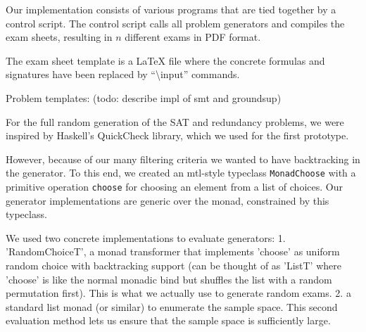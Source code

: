 Our implementation consists of various programs that are tied together by a control script.
The control script calls all problem generators
and compiles the exam sheets, resulting in $n$ different exams in PDF format.

The exam sheet template is a \LaTeX{} file
where the concrete formulas and signatures
have been replaced by ``\textbackslash{}input'' commands.



Problem templates: (todo: describe impl of smt and groundsup)



For the full random generation of the SAT and redundancy problems,
we were inspired by Haskell's QuickCheck library,
which we used for the first prototype.

However, because of our many filtering criteria we wanted to have backtracking in the generator.
To this end, we created an mtl-style typeclass \texttt{MonadChoose} with a primitive operation \texttt{choose} for choosing an element from a list of choices.
Our generator implementations are generic over the monad, constrained by this typeclass.

We used two concrete implementations to evaluate generators:
1. 'RandomChoiceT', a monad transformer that implements 'choose' as uniform random choice with backtracking support
    (can be thought of as 'ListT' where 'choose' is like the normal monadic bind but shuffles the list with a random permutation first).
    This is what we actually use to generate random exams.
2. a standard list monad (or similar) to enumerate the sample space.
    This second evaluation method lets us ensure that the sample space is sufficiently large.

